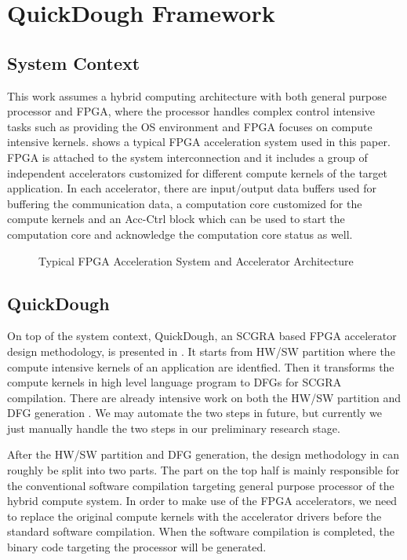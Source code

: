 \section{QuickDough Framework}\label{sec:framework}

\subsection{System Context}
This work assumes a hybrid computing architecture with both general purpose processor and FPGA, where the processor handles complex control intensive tasks such as providing the OS environment and FPGA focuses on compute intensive kernels.  shows a typical FPGA acceleration system used in this paper. FPGA is attached to the system interconnection and it includes a group of independent accelerators customized for different compute kernels of the target application. In each accelerator, there are input/output data buffers used for buffering the communication data, a computation core customized for the compute kernels and an Acc-Ctrl block which can be used to start the computation core and acknowledge the computation core status as well. 

\begin{figure}[H]
    \caption{Typical FPGA Acceleration System and Accelerator Architecture}
    \label{fig:typical-FPGA-accelerator}
\end{figure}

\subsection{QuickDough}
On top of the system context, QuickDough, an SCGRA based FPGA accelerator design methodology, is presented in . It starts from HW/SW partition where the compute intensive kernels of an application are identfied. Then it transforms the compute kernels in high level language program to DFGs for SCGRA compilation. There are already intensive work on both the HW/SW partition and DFG generation \cite{Baleani2002HW-SW} \cite{ROCCC}. We may automate the two steps in future, but currently we just manually handle the two steps in our preliminary research stage. 

After the HW/SW partition and DFG generation, the design methodology in  can roughly be split  into two parts. The part on the top half is mainly responsible for the conventional software compilation targeting general purpose processor of the hybrid compute system. In order to make use of the FPGA accelerators, we need to replace the original compute kernels with the accelerator drivers before the standard software compilation. When the software compilation is completed, the binary code targeting the processor will be generated. 

